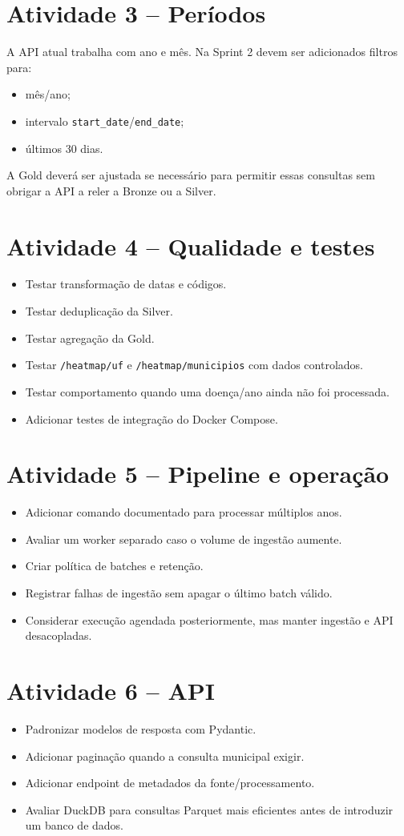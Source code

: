 \documentclass[12pt,a4paper]{article}
\begin{document}
\section{Atividade 3 -- Períodos}
A API atual trabalha com ano e mês. Na Sprint 2 devem ser adicionados filtros para:
\begin{itemize}
\item mês/ano;
\item intervalo \texttt{start\_date}/\texttt{end\_date};
\item últimos 30 dias.
\end{itemize}
A Gold deverá ser ajustada se necessário para permitir essas consultas sem obrigar a API a reler a Bronze ou a Silver.

\section{Atividade 4 -- Qualidade e testes}
\begin{itemize}
\item Testar transformação de datas e códigos.
\item Testar deduplicação da Silver.
\item Testar agregação da Gold.
\item Testar \texttt{/heatmap/uf} e \texttt{/heatmap/municipios} com dados controlados.
\item Testar comportamento quando uma doença/ano ainda não foi processada.
\item Adicionar testes de integração do Docker Compose.
\end{itemize}

\section{Atividade 5 -- Pipeline e operação}
\begin{itemize}
\item Adicionar comando documentado para processar múltiplos anos.
\item Avaliar um worker separado caso o volume de ingestão aumente.
\item Criar política de batches e retenção.
\item Registrar falhas de ingestão sem apagar o último batch válido.
\item Considerar execução agendada posteriormente, mas manter ingestão e API desacopladas.
\end{itemize}

\section{Atividade 6 -- API}
\begin{itemize}
\item Padronizar modelos de resposta com Pydantic.
\item Adicionar paginação quando a consulta municipal exigir.
\item Adicionar endpoint de metadados da fonte/processamento.
\item Avaliar DuckDB para consultas Parquet mais eficientes antes de introduzir um banco de dados.
\end{itemize}
\end{document}
